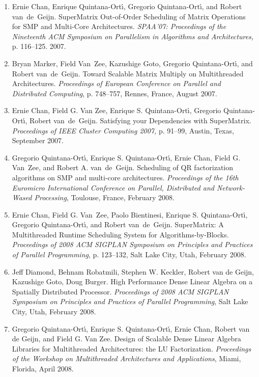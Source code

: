 \begin{enumerate}
\item
Ernie Chan, Enrique Quintana-Ort\'{\i}, Gregorio Quintana-Ort\'{\i}, and Robert
van~de~Geijn.
\newblock
SuperMatrix Out-of-Order Scheduling of Matrix Operations
for SMP and Multi-Core Architectures.
\newblock
{\em SPAA'07: Proceedings of the Nineteenth ACM Symposium
on Parallelism in Algorithms and Architectures,}
p. 116--125. 2007.

\item
Bryan Marker, Field Van~Zee, Kazushige Goto, Gregorio Quintana-Ort\'{\i},
and Robert van~de~Geijn.
\newblock
Toward Scalable Matrix Multiply on Multithreaded Architectures.  
\newblock
{\em Proceedings of European Conference on Parallel and Distributed
Computing},
p. 748--757, Rennes, France, August 2007.

\item
Ernie Chan, Field G. Van Zee, Enrique S. Quintana-Ort\'{\i},
Gregorio Quintana-Ort\'{\i}, Robert van~de~Geijn. 
\newblock
Satisfying your Dependencies with SuperMatrix.
\newblock
{\em Proceedings of IEEE Cluster Computing 2007,}
p. 91--99, Austin, Texas, September 2007.

\item
Gregorio Quintana-Ort\'{\i}, Enrique S. Quintana-Ort\'{\i}, Ernie Chan,
Field G. Van~Zee, and Robert A. van~de~Geijn. 
\newblock
Scheduling of QR factorization algorithms on SMP and multi-core architectures.
\newblock
{\em Proceedings of the 16th Euromicro International Conference on Parallel,
Distributed and Network-Wased Processing},
Toulouse, France, February 2008.

\item
Ernie Chan, Field G. Van~Zee, Paolo Bientinesi, Enrique S. Quintana-Ort\'{\i},
Gregorio Quintana-Ort\'{\i}, and Robert van~de~Geijn.
\newblock
SuperMatrix: A Multithreaded Runtime Scheduling System for Algorithms-by-Blocks.  
\newblock
{\em Proceedings of 2008 ACM SIGPLAN Symposium on Principles and Practices
of Parallel Programming},
p. 123--132, Salt Lake City, Utah, February 2008.

\item
Jeff Diamond, Behnam Robatmili, Stephen W. Keckler, Robert van de
Geijn, Kazushige Goto, Doug Burger.
\newblock
High Performance Dense Linear Algebra on a Spatially Distributed Processor. 
\newblock
{\em Proceedings of 2008 ACM SIGPLAN Symposium on Principles and Practices
of Parallel Programming},
Salt Lake City, Utah, February 2008.

\item
Gregorio Quintana-Ort\'{\i}, Enrique S. Quintana-Ort\'{\i}, Ernie Chan,
Robert van de Geijn, and Field G. Van Zee.
\newblock
Design of Scalable Dense Linear Algebra Libraries for Multithreaded
Architectures: the LU Factorization.
\newblock
{\em Proceedings of the Workshop on Multithreaded Architectures and
Applications},
Miami, Florida, April 2008.


\end{enumerate}
